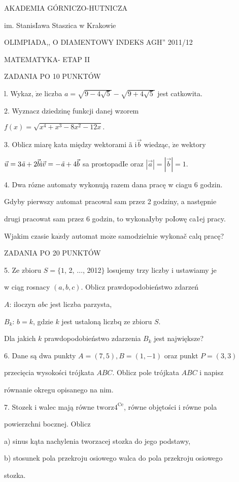 \documentclass[a4paper,12pt]{article}
\begin{document}
AKADEMIA GÓRNICZO-HUTNICZA

im. StanisIawa Staszica w Krakowie

OLIMPIADA,, O DIAMENTOWY INDEKS AGH'' 2011/12

MATEMATYKA- ETAP II

ZADANIA PO 10 PUNKTÓW

l. Wykaz, $\dot{\mathrm{z}}\mathrm{e}$ liczba $a=\sqrt{9-4\sqrt{5}}-\sqrt{9+4\sqrt{5}}$ jest catkowita.

2. Wyznacz dziedzinę funkcji danej wzorem

$f(x)=\sqrt{x^{4}+x^{3}-8x^{2}-12x}.$

3. Oblicz miarę kata między wektorami ã $\mathrm{i} \vec{b}$ wiedząc, $\dot{\mathrm{z}}\mathrm{e}$ wektory

$\vec{u}=3\text{{\it ã}}+2\vec{b} \mathrm{i} \vec{v}=-\text{{\it ã}}+4\vec{b}$ sa prostopadIe oraz $|\vec{a}|=|\vec{b}|=1.$

4. Dwa rózne automaty wykonują razem dana pracę w ciagu 6 godzin.

Gdyby pierwszy automat pracowal sam przez 2 godziny, a następnie

drugi pracowat sam przez 6 godzin, to wykonaIyby poIowę ca1ej pracy.

Wjakim czasie $\mathrm{k}\mathrm{a}\dot{\mathrm{z}}\mathrm{d}\mathrm{y}$ automat $\mathrm{m}\mathrm{o}\dot{\mathrm{z}}\mathrm{e}$ samodzielnie wykonač calq pracę?

ZADANIA PO 20 PUNKTÓW

5. Ze zbioru $S = \{1$, 2, $\ldots$, 2012$\}$ losujemy trzy liczby i ustawiamy je

w ciąg rosnacy $(a,b,c)$. Oblicz prawdopodobieństwo zdarzeń

$A$: iloczyn $abc$ jest liczba parzysta,

$B_{k}$: $b=k$, gdzie $k$ jest ustaloną liczbq ze zbioru $S.$

Dla jakich $k$ prawdopodobieństwo zdarzenia $B_{k}$ jest największe?

6. Dane są dwa punkty $A = (7,5), B = (1,-1)$ oraz punkt $P = (3,3)$

przecięcia wysokości trójkata $ABC$. Oblicz pole trójkata $ABC$ i napisz

równanie okregu opisanego na nim.

7. Stozek i walec mają równe $\mathrm{t}\mathrm{w}\mathrm{o}\mathrm{r}\mathrm{z}4^{\mathrm{C}\mathrm{e}}$, równe objętości i równe pola

powierzchni bocznej. Oblicz

a) sinus kąta nachylenia tworzacej stozka do jego podstawy,

b) stosunek pola przekroju osiowego walca do pola przekroju osiowego

stozka.
\end{document}
